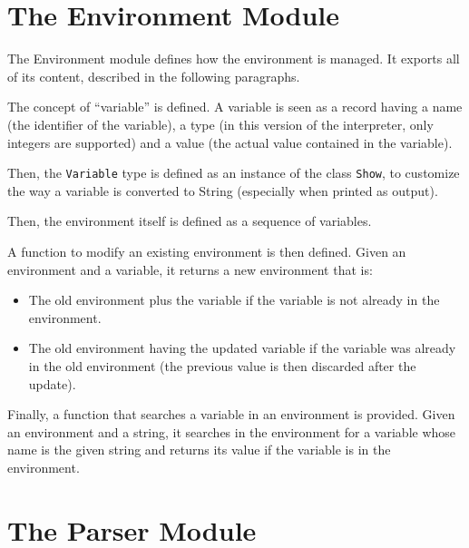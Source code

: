 \documentclass{esposito-documentation}
\begin{document}
\section{The Environment Module}


The Environment module defines how the environment is managed. It exports all of its content, described in the following paragraphs.

The concept of ``variable'' is defined. A variable is seen as a record having a
name (the identifier of the variable), a type (in this version of the
interpreter, only integers are supported) and a value (the actual value
contained in the variable).



Then, the \lstinline|Variable| type is defined as an instance of the class
\lstinline|Show|, to customize the way a variable is converted to String
(especially when printed as output).



Then, the environment itself is defined as a sequence of variables.



A function to modify an existing environment is then defined. Given an environment and a variable, it returns a new environment that is:
\begin{itemize}
	\item The old environment plus the variable if the variable is not already
		in the environment.
	\item The old environment having the updated variable if the variable was
		already in the old environment (the previous value is then discarded
		after the update).
\end{itemize}


Finally, a function that searches a variable in an environment is provided.
Given an environment and a string, it searches in the environment for a
variable whose name is the given string and returns its value if the variable
is in the environment.



\section{The Parser Module}
\end{document}
